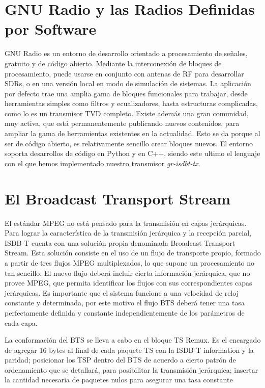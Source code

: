 \documentclass[journal,comsoc]{IEEEtran}
\begin{document}
\section{GNU Radio y las Radios Definidas por Software}
GNU Radio es un entorno de desarrollo orientado a procesamiento de señales,
gratuito y de código abierto. Mediante la interconexión de bloques de procesamiento, puede usarse en conjunto con antenas de RF para desarrollar SDRs, o en una versión local en modo de simulación de sistemas. La aplicación por defecto trae una amplia gama de bloques funcionales para
trabajar, desde herramientas simples como filtros y ecualizadores, hasta estructuras complicadas, como lo es un transmisor TVD completo. Existe además una gran comunidad, muy activa, que está permanentemente publicando nuevos contenidos, para ampliar la gama de herramientas existentes en la actualidad. Esto se da porque al ser de código abierto, es relativamente sencillo crear bloques nuevos. El entorno soporta desarrollos de código en Python y en C++, siendo este ultimo el lenguaje con el que hemos implementado nuestro transmisor \textit{gr-isdbt-tx}. 

\section{El Broadcast Transport Stream}
El estándar MPEG no está pensado para la transmisión en capas jerárquicas.
Para lograr la característica de la transmisión jerárquica y la recepción parcial, ISDB-T cuenta con una solución propia denominada Broadcast Transport Stream. Esta solución consiste en el uso de un flujo de transporte propio, formado a partir de tres flujos MPEG multiplexados, lo que supone un procesamiento no tan sencillo. El nuevo flujo deberá incluir cierta información jerárquica, que no provee MPEG, que permita identificar los flujos con sus correspondientes capas jerárquicas. Es importante que el sistema funcione a una velocidad de reloj constante y determinada, por este motivo el flujo BTS deberá tener una tasa perfectamente definida y constante independientemente de los parámetros de cada capa. 

La conformación del BTS se lleva a cabo en el bloque TS Remux. Es el encargado de agregar 16 bytes al final de cada paquete TS con la ISDB-T information y la paridad; posicionar los TSP dentro del BTS de acuerdo a cierto patrón de ordenamiento que se detallará, para posibilitar la transmisión jerárquica; insertar la cantidad necesaria de paquetes nulos para asegurar una tasa constante 
\end{document}
